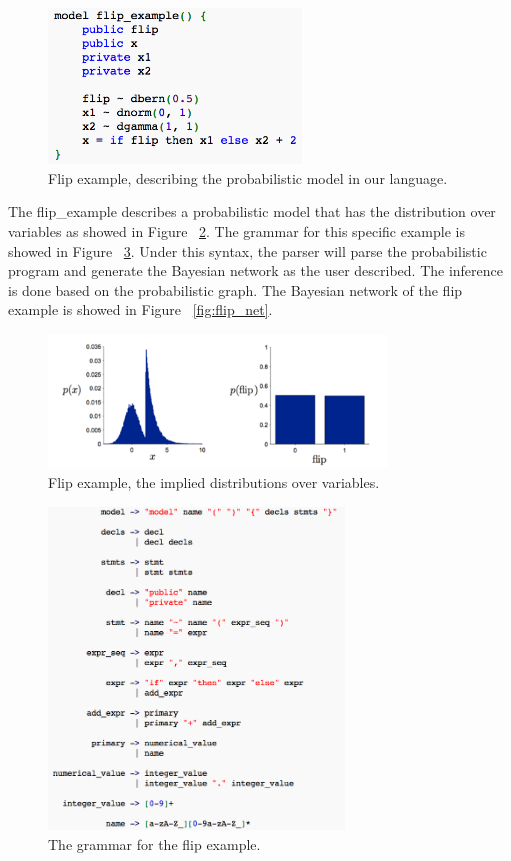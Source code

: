 \begin{figure}
    \centering
    \includegraphics[width=0.6\textwidth]{figures/flip_eg.png}
    \caption{Flip example, describing the probabilistic model in our language.}
    \label{fig:flip_eg}
\end{figure}

The flip\_example describes a probabilistic model that has the distribution over variables as showed in Figure ~\ref{fig:flip_dist}. The grammar for this specific example is showed in Figure ~\ref{fig:flip_syn}. Under this syntax, the parser will parse the probabilistic program and generate the Bayesian network as the user described. The inference is done based on the probabilistic graph. The Bayesian network of the flip example is showed in Figure ~\ref{fig:flip_net}.


\begin{figure}
    \centering
    \includegraphics[width=0.8\textwidth]{figures/flip_dist.png}
    \caption{Flip example, the implied distributions over variables.}
    \label{fig:flip_dist}
\end{figure}

\begin{figure}
    \centering
    \includegraphics[width=0.7\textwidth]{figures/flip_syn.png}
    \caption{The grammar for the flip example.}
    \label{fig:flip_syn}
\end{figure}


